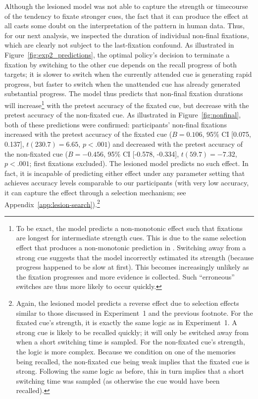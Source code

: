 Although the lesioned model was not able to capture the strength or timecourse of the tendency to fixate stronger cues, the fact that it can produce the effect at all casts some doubt on the interpretation of the pattern in human data. Thus, for our next analysis, we inspected the duration of individual non-final fixations, which are clearly not subject to the last-fixation confound. As illustrated in Figure~\ref{fig:exp2_predictions}, the optimal policy's decision to terminate a fixation by switching to the other cue depends on the recall progress of both targets; it is slower to switch when the currently attended cue is generating rapid progress, but faster to switch when the unattended cue has already generated substantial progress. The model thus predicts that non-final fixation durations will increase\footnote{%
    To be exact, the model predicts a non-monotonic effect such that fixations are longest for intermediate strength cues. This is due to the same selection effect that produces a non-monotonic prediction in . Switching away from a strong cue suggests that the model incorrectly estimated its strength (because progress happened to be slow at first). This becomes increasingly unlikely as the fixation progresses and more evidence is collected. Such ``erroneous'' switches are thus more likely to occur quickly. 
} with the pretest accuracy of the fixated cue, but decrease with the pretest accuracy of the non-fixated cue. As illustrated in Figure~\ref{fig:nonfinal}, both of these predictions were confirmed: participants' non-final fixations increased with the pretest accuracy of the fixated cue ($B = 0.106$, 95\% CI [0.075, 0.137], $t(230.7)=6.65$, $p < .001$) and decreased with the pretest accuracy of the non-fixated cue ($B = -0.456$, 95\% CI [-0.578, -0.334], $t(59.7)=-7.32$, $p < .001$; first fixations excluded). The lesioned model predicts no such effect. In fact, it is incapable of predicting either effect under any parameter setting that achieves accuracy levels comparable to our participants (with very low accuracy, it can capture the effect through a selection mechanism; see Appendix~\ref{app:lesion-search}).\footnote{
    Again, the lesioned model predicts a reverse effect due to selection effects similar to those discussed in Experiment~1 and the previous footnote. For the fixated cue's strength, it is exactly the same logic as in Experiment~1. A strong cue is likely to be recalled quickly; it will only be switched away from when a short switching time is sampled. For the non-fixated cue's strength, the logic is more complex. Because we condition on one of the memories being recalled, the non-fixated cue being weak implies that the fixated cue is strong. Following the same logic as before, this in turn implies that a short switching time was sampled (as otherwise the cue would have been recalled).
}

